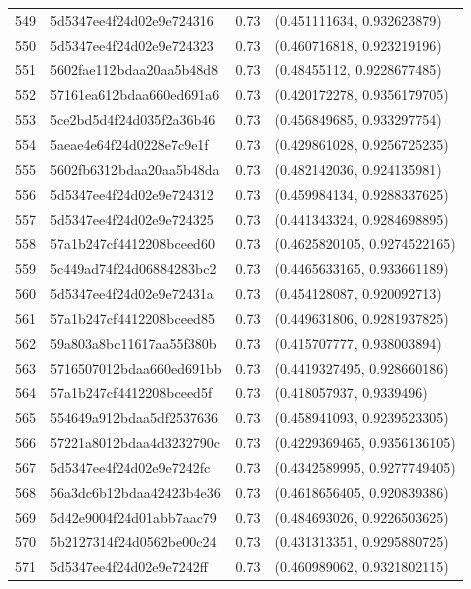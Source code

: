 \begin{table}[ht]
\begin{tabular}{rlrl}
  549 & 5d5347ee4f24d02e9e724316 & 0.73 & (0.451111634, 0.932623879) \\ 
  550 & 5d5347ee4f24d02e9e724323 & 0.73 & (0.460716818, 0.923219196) \\ 
  551 & 5602fae112bdaa20aa5b48d8 & 0.73 & (0.48455112, 0.9228677485) \\ 
  552 & 57161ea612bdaa660ed691a6 & 0.73 & (0.420172278, 0.9356179705) \\ 
  553 & 5ce2bd5d4f24d035f2a36b46 & 0.73 & (0.456849685, 0.933297754) \\ 
  554 & 5aeae4e64f24d0228e7c9e1f & 0.73 & (0.429861028, 0.9256725235) \\ 
  555 & 5602fb6312bdaa20aa5b48da & 0.73 & (0.482142036, 0.924135981) \\ 
  556 & 5d5347ee4f24d02e9e724312 & 0.73 & (0.459984134, 0.9288337625) \\ 
  557 & 5d5347ee4f24d02e9e724325 & 0.73 & (0.441343324, 0.9284698895) \\ 
  558 & 57a1b247cf4412208bceed60 & 0.73 & (0.4625820105, 0.9274522165) \\ 
  559 & 5c449ad74f24d06884283bc2 & 0.73 & (0.4465633165, 0.933661189) \\ 
  560 & 5d5347ee4f24d02e9e72431a & 0.73 & (0.454128087, 0.920092713) \\ 
  561 & 57a1b247cf4412208bceed85 & 0.73 & (0.449631806, 0.9281937825) \\ 
  562 & 59a803a8bc11617aa55f380b & 0.73 & (0.415707777, 0.938003894) \\ 
  563 & 5716507012bdaa660ed691bb & 0.73 & (0.4419327495, 0.928660186) \\ 
  564 & 57a1b247cf4412208bceed5f & 0.73 & (0.418057937, 0.9339496) \\ 
  565 & 554649a912bdaa5df2537636 & 0.73 & (0.458941093, 0.9239523305) \\ 
  566 & 57221a8012bdaa4d3232790c & 0.73 & (0.4229369465, 0.9356136105) \\ 
  567 & 5d5347ee4f24d02e9e7242fc & 0.73 & (0.4342589995, 0.9277749405) \\ 
  568 & 56a3dc6b12bdaa42423b4e36 & 0.73 & (0.4618656405, 0.920839386) \\ 
  569 & 5d42e9004f24d01abb7aac79 & 0.73 & (0.484693026, 0.9226503625) \\ 
  570 & 5b2127314f24d0562be00c24 & 0.73 & (0.431313351, 0.9295880725) \\ 
  571 & 5d5347ee4f24d02e9e7242ff & 0.73 & (0.460989062, 0.9321802115) \\ 

\end{tabular}
\end{table}
